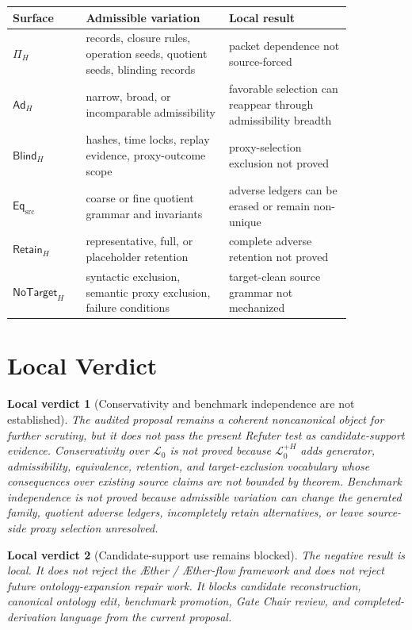 \documentclass[11pt]{article}
\newcommand{\Aether}{\AE{}ther}
\newcommand{\Aflow}{\AE{}ther-flow}
\newcommand{\TheoryProgram}{\Aether{} / \Aflow{} framework}
\newcommand{\Lang}{\mathcal{L}_{0}}
\newcommand{\LangPlus}{\mathcal{L}_{0}^{+H}}
\newcommand{\AdH}{\mathsf{Ad}_{H}}
\newcommand{\BlindH}{\mathsf{Blind}_{H}}
\newcommand{\EqSrc}{\mathsf{Eq}_{\mathrm{src}}}
\newcommand{\RetainH}{\mathsf{Retain}_{H}}
\newcommand{\NoTargetH}{\mathsf{NoTarget}_{H}}
\newtheorem{verdict}{Local verdict}
\begin{document}
\begin{center}
\begin{tabular}{p{0.18\linewidth}p{0.36\linewidth}p{0.31\linewidth}}
\textbf{Surface} & \textbf{Admissible variation} & \textbf{Local result} \\
\hline
\(\Pi_H\) & records, closure rules, operation seeds, quotient seeds, blinding records & packet dependence not source-forced \\
\(\AdH\) & narrow, broad, or incomparable admissibility & favorable selection can reappear through admissibility breadth \\
\(\BlindH\) & hashes, time locks, replay evidence, proxy-outcome scope & proxy-selection exclusion not proved \\
\(\EqSrc\) & coarse or fine quotient grammar and invariants & adverse ledgers can be erased or remain non-unique \\
\(\RetainH\) & representative, full, or placeholder retention & complete adverse retention not proved \\
\(\NoTargetH\) & syntactic exclusion, semantic proxy exclusion, failure conditions & target-clean source grammar not mechanized \\
\end{tabular}
\end{center}

\section{Local Verdict}

\begin{verdict}[Conservativity and benchmark independence are not established]
The audited proposal remains a coherent noncanonical object for further
scrutiny, but it does not pass the present Refuter test as candidate-support
evidence. Conservativity over \(\Lang\) is not proved because \(\LangPlus\)
adds generator, admissibility, equivalence, retention, and target-exclusion
vocabulary whose consequences over existing source claims are not bounded by
theorem. Benchmark independence is not proved because admissible variation
can change the generated family, quotient adverse ledgers, incompletely
retain alternatives, or leave source-side proxy selection unresolved.
\end{verdict}

\begin{verdict}[Candidate-support use remains blocked]
The negative result is local. It does not reject the \TheoryProgram{} and
does not reject future ontology-expansion repair work. It blocks candidate
reconstruction, canonical ontology edit, benchmark promotion, Gate Chair
review, and completed-derivation language from the current proposal.
\end{verdict}
\end{document}
